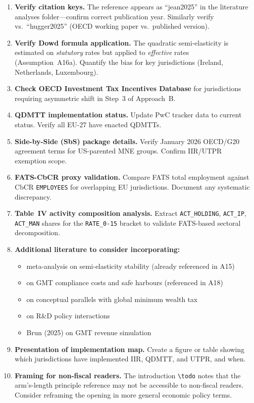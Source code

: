 \documentclass[11pt,a4paper]{article}
\newcommand{\code}[1]{\texttt{#1}}
\begin{document}
\begin{enumerate}
\item \textbf{Verify citation keys.} The \citet{jean2026} reference appears as ``jean2025'' in the literature analyses folder---confirm correct publication year. Similarly verify \citet{hugger2026} vs.\ ``hugger2025'' (OECD working paper vs.\ published version).
\item \textbf{Verify Dowd formula application.} The quadratic semi-elasticity is estimated on \emph{statutory} rates but applied to \emph{effective} rates (Assumption~A16a). Quantify the bias for key jurisdictions (Ireland, Netherlands, Luxembourg).
\item \textbf{Check OECD Investment Tax Incentives Database} for jurisdictions requiring asymmetric shift in Step~3 of Approach~B.
\item \textbf{QDMTT implementation status.} Update PwC tracker data to current status. Verify all EU-27 have enacted QDMTTs.
\item \textbf{Side-by-Side (SbS) package details.} Verify January 2026 OECD/G20 agreement terms for US-parented MNE groups. Confirm IIR/UTPR exemption scope.
\item \textbf{FATS-CbCR proxy validation.} Compare FATS total employment against CbCR \code{EMPLOYEES} for overlapping EU jurisdictions. Document any systematic discrepancy.
\item \textbf{Table~IV activity composition analysis.} Extract \code{ACT\_HOLDING}, \code{ACT\_IP}, \code{ACT\_MAN} shares for the \code{RATE\_0-15} bracket to validate FATS-based sectoral decomposition.
\item \textbf{Additional literature to consider incorporating:}
  \begin{itemize}[noitemsep]
  \item \citet{beer2020} meta-analysis on semi-elasticity stability (already referenced in A15)
  \item \citet{schanz2023} on GMT compliance costs and safe harbours (referenced in A18)
  \item \citeauthor{boadway2026} on conceptual parallels with global minimum wealth tax
  \item \citeauthor{akcigit2022} on R\&D policy interactions
  \item Brun (2025) on GMT revenue simulation
  \end{itemize}
\item \textbf{Presentation of implementation map.} Create a figure or table showing which jurisdictions have implemented IIR, QDMTT, and UTPR, and when.
\item \textbf{Framing for non-fiscal readers.} The introduction \texttt{\textbackslash todo} notes that the arm's-length principle reference may not be accessible to non-fiscal readers. Consider reframing the opening in more general economic policy terms.
\end{enumerate}
\end{document}
